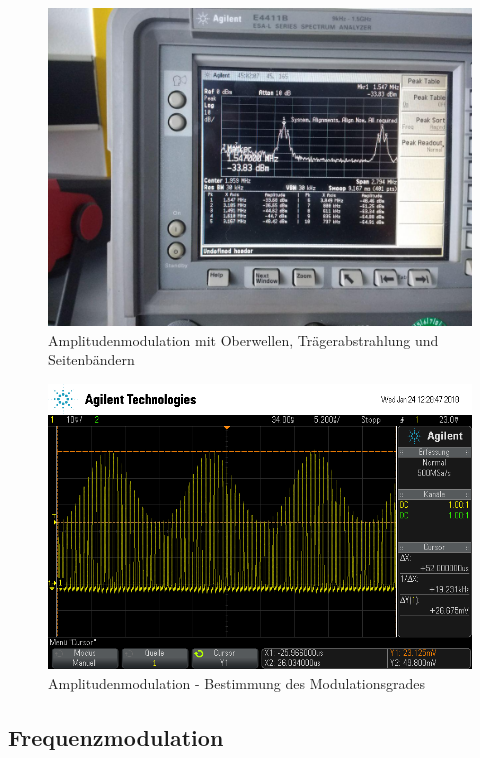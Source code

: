 \begin{figure}
	\centering
	\includegraphics[width=\textwidth]{img/Aufgabenteil_c1.jpg}
	\caption{Amplitudenmodulation mit Oberwellen, Trägerabstrahlung und Seitenbändern}
	\label{c1}
\end{figure}

\begin{figure}
	\centering
	\includegraphics[width=\textwidth]{img/c_scope_247.png}
	\caption{Amplitudenmodulation - Bestimmung des Modulationsgrades}
	\label{c2}
\end{figure}

\subsection{Frequenzmodulation}

